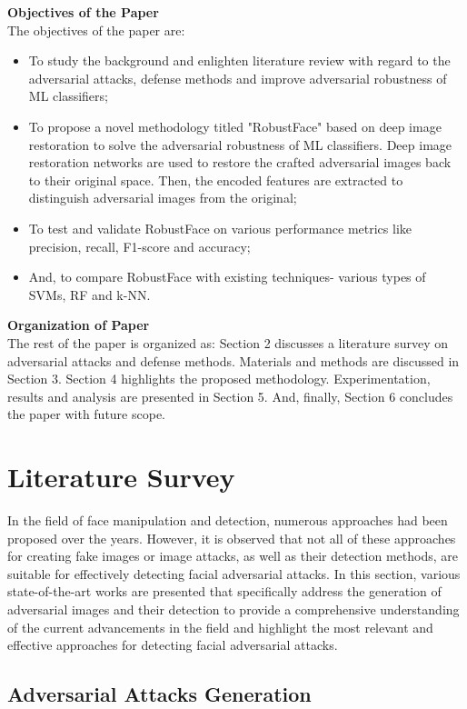 \documentclass[sn-mathphys]{sn-jnl}%
\theoremstyle{thmstyleone}%
\theoremstyle{thmstyletwo}%
\theoremstyle{thmstylethree}%
\begin{document}
\noindent
\textbf{Objectives of the Paper}\\
The objectives of the paper are:
\begin{itemize}
 \item To study the background and enlighten literature review with regard to the adversarial attacks, defense methods and improve adversarial robustness of ML classifiers;  
 \item To propose a novel methodology titled "RobustFace" based on deep image restoration to solve the adversarial robustness of ML classifiers. Deep image restoration networks are used to restore the crafted adversarial images back to their original space. Then, the encoded features are extracted to distinguish adversarial images from the original;
\item To test and validate RobustFace on various performance metrics like precision, recall, F1-score and accuracy; 
\item And, to compare RobustFace with existing techniques- various types of SVMs, RF and k-NN. 
\end{itemize}
\textbf{Organization of Paper}\\
The rest of the paper is organized as: Section 2 discusses a literature survey on adversarial attacks and defense methods. Materials and methods are discussed in Section 3. Section 4 highlights the proposed methodology. Experimentation, results and analysis are presented in Section 5. And, finally, Section 6 concludes the paper with future scope.


\section{Literature Survey}\label{Literature_survey}
In the field of face manipulation and detection, numerous approaches had been proposed over the years. However, it is observed that not all of these approaches for creating fake images or image attacks, as well as their detection methods, are suitable for effectively detecting facial adversarial attacks. In this section, various state-of-the-art works are presented that specifically address the generation of adversarial images and their detection to provide a comprehensive understanding of the current advancements in the field and highlight the most relevant and effective approaches for detecting facial adversarial attacks.

\subsection{Adversarial Attacks Generation} 
\end{document}
